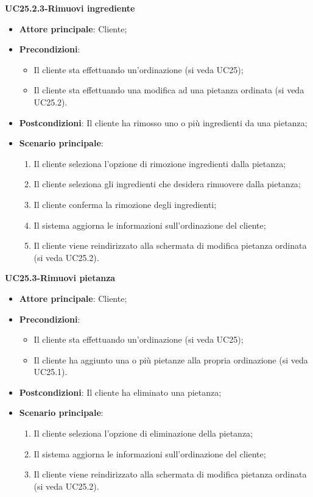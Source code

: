 \pagebreak
\textbf{UC25.2.3-Rimuovi ingrediente}

\begin{itemize}
\item \textbf{Attore principale}: Cliente;
\item \textbf{Precondizioni}:
\begin{itemize}
\item Il cliente sta effettuando un'ordinazione (si veda UC25);
\item Il cliente sta effettuando una modifica ad una pietanza ordinata (si veda UC25.2).
\end{itemize}
\item \textbf{Postcondizioni}: Il cliente ha rimosso uno o più ingredienti da una pietanza;
\item \textbf{Scenario principale}:
\begin{enumerate}
\item Il cliente seleziona l'opzione di rimozione ingredienti dalla pietanza;
\item Il cliente seleziona gli ingredienti che desidera rimuovere dalla pietanza;
\item Il cliente conferma la rimozione degli ingredienti;
\item Il sistema aggiorna le informazioni sull'ordinazione del cliente;
\item Il cliente viene reindirizzato alla schermata di modifica pietanza ordinata (si veda UC25.2).
\end{enumerate}
\end{itemize}

\textbf{UC25.3-Rimuovi pietanza}

\begin{itemize}
\item \textbf{Attore principale}: Cliente;
\item \textbf{Precondizioni}:
\begin{itemize}
\item Il cliente sta effettuando un'ordinazione (si veda UC25);
\item Il cliente ha aggiunto una o più pietanze alla propria ordinazione (si veda UC25.1).
\end{itemize}
\item \textbf{Postcondizioni}: Il cliente ha eliminato una pietanza;
\item \textbf{Scenario principale}:
\begin{enumerate}
\item Il cliente seleziona l'opzione di eliminazione della pietanza;
\item Il sistema aggiorna le informazioni sull'ordinazione del cliente;
\item Il cliente viene reindirizzato alla schermata di modifica pietanza ordinata (si veda UC25.2).
\end{enumerate}
\end{itemize}

